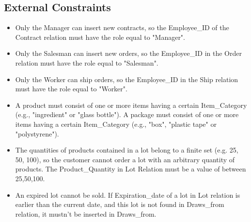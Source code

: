 \subsection{External Constraints}
\begin{itemize}
\item Only the Manager can insert new contracts, so the Employee\_ID of the Contract relation must have the role equal to "Manager". 
\item Only the Salesman can insert new orders, so the Employee\_ID in the Order relation must have the role equal to "Salesman". 
\item Only the Worker can ship orders, so the Employee\_ID in the Ship relation must have the role equal to "Worker".
\item A product must consist of one or more items having a certain Item\_Category (e.g., "ingredient" or "glass bottle"). A package must consist of one or more items having a certain Item\_Category (e.g., "box", "plastic tape" or "polystyrene"). 
\item The quantities of products contained in a lot belong to a finite set (e.g. 25, 50, 100), so the customer cannot order a lot with an arbitrary quantity of products. The Product\_Quantity in Lot Relation must be a value of between 25,50,100.
\item An expired lot cannot be sold. If Expiration\_date of a lot in  Lot relation is earlier than the current date, and this lot is not found in Draws\_from relation, it mustn't be  inserted in Draws\_from.
\end{itemize}